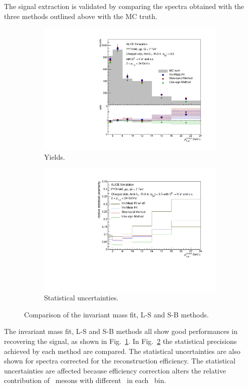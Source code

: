 The signal extraction is validated by comparing the spectra obtained with the three methods outlined above with the MC truth. 
\begin{figure}[tbh]
\centering
\begin{subfigure}{0.49\textwidth}
  \centering
  \includegraphics[width=1.0\linewidth]{img/HQ16_Simulation_MethodComparison}
  \caption{Yields.}
  \label{fig:HQ16_Simulation_MethodComparison}
\end{subfigure}
\begin{subfigure}{0.49\textwidth}
  \centering
  \includegraphics[width=1.0\linewidth]{img/HQ16_Simulation_UncertaintyComparison}
  \caption{Statistical uncertainties.}
  \label{fig:HQ16_Simulation_UncertaintyComparison}
\end{subfigure}
\caption{Comparison of the invariant mass fit, L-S and S-B methods.}
\label{fig:MethComp}
\end{figure}
The invariant mass fit, L-S and S-B methods all show good performances in recovering the signal, as shown in Fig.~\ref{fig:HQ16_Simulation_MethodComparison}.
In Fig.~\ref{fig:HQ16_Simulation_UncertaintyComparison} the statistical precisions achieved by each method are compared. The statistical uncertainties are
also shown for spectra corrected for the reconstruction efficiency. The statistical uncertainties are affected because efficiency correction alters the 
relative contribution of \Dzero\ mesons with different \pt\ in each \ptchjet\ bin.
